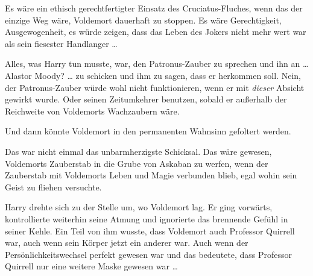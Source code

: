 Es wäre ein ethisch gerechtfertigter Einsatz des Cruciatus-Fluches, wenn das der einzige Weg wäre, Voldemort dauerhaft zu stoppen. Es wäre Gerechtigkeit, Ausgewogenheit, es würde zeigen, dass das Leben des Jokers nicht mehr wert war als sein fiesester Handlanger …

Alles, was Harry tun musste, war, den Patronus-Zauber zu sprechen und ihn an … Alastor Moody? … zu schicken und ihm zu sagen, dass er herkommen soll. Nein, der Patronus-Zauber würde wohl nicht funktionieren, wenn er mit \emph{dieser} Absicht gewirkt wurde. Oder seinen Zeitumkehrer benutzen, sobald er außerhalb der Reichweite von Voldemorts Wachzaubern wäre.

Und dann könnte Voldemort in den permanenten Wahnsinn gefoltert werden.

Das war nicht einmal das unbarmherzigste Schicksal. Das wäre gewesen, Voldemorts Zauberstab in die Grube von Askaban zu werfen, wenn der Zauberstab mit Voldemorts Leben und Magie verbunden blieb, egal wohin sein Geist zu fliehen versuchte.

Harry drehte sich zu der Stelle um, wo Voldemort lag. Er ging vorwärts, kontrollierte weiterhin seine Atmung und ignorierte das brennende Gefühl in seiner Kehle. Ein Teil von ihm wusste, dass Voldemort auch Professor Quirrell war, auch wenn sein Körper jetzt ein anderer war. Auch wenn der Persönlichkeitswechsel perfekt gewesen war und das bedeutete, dass Professor Quirrell nur eine weitere Maske gewesen war …

